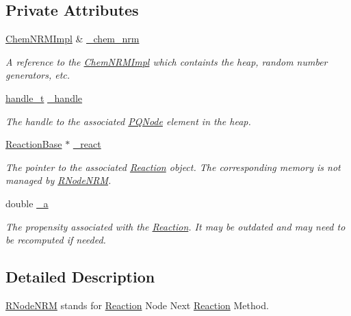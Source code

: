\subsection*{Private Attributes}
\begin{DoxyCompactItemize}
\item 
\hyperlink{classchem_1_1ChemNRMImpl}{Chem\-N\-R\-M\-Impl} \& \hyperlink{classchem_1_1RNodeNRM_acff43a1b27a778b6534bd8010904f821}{\-\_\-chem\-\_\-nrm}
\begin{DoxyCompactList}\small\item\em A reference to the \hyperlink{classchem_1_1ChemNRMImpl}{Chem\-N\-R\-M\-Impl} which containts the heap, random number generators, etc. \end{DoxyCompactList}\item 
\hyperlink{namespacechem_abf1718e53f56f85003559d20e531a1a4}{handle\-\_\-t} \hyperlink{classchem_1_1RNodeNRM_ad124c85b0f1b479cf0c1f4bf75230c19}{\-\_\-handle}
\begin{DoxyCompactList}\small\item\em The handle to the associated \hyperlink{classchem_1_1PQNode}{P\-Q\-Node} element in the heap. \end{DoxyCompactList}\item 
\hyperlink{classchem_1_1ReactionBase}{Reaction\-Base} $\ast$ \hyperlink{classchem_1_1RNodeNRM_add823fa4b223afe0d750ed731c827d07}{\-\_\-react}
\begin{DoxyCompactList}\small\item\em The pointer to the associated \hyperlink{classchem_1_1Reaction}{Reaction} object. The corresponding memory is not managed by \hyperlink{classchem_1_1RNodeNRM}{R\-Node\-N\-R\-M}. \end{DoxyCompactList}\item 
double \hyperlink{classchem_1_1RNodeNRM_ae16aa8e75649d855f4b6eae8b00ed1db}{\-\_\-a}
\begin{DoxyCompactList}\small\item\em The propensity associated with the \hyperlink{classchem_1_1Reaction}{Reaction}. It may be outdated and may need to be recomputed if needed. \end{DoxyCompactList}\end{DoxyCompactItemize}


\subsection{Detailed Description}
\hyperlink{classchem_1_1RNodeNRM}{R\-Node\-N\-R\-M} stands for \hyperlink{classchem_1_1Reaction}{Reaction} Node Next \hyperlink{classchem_1_1Reaction}{Reaction} Method. 


